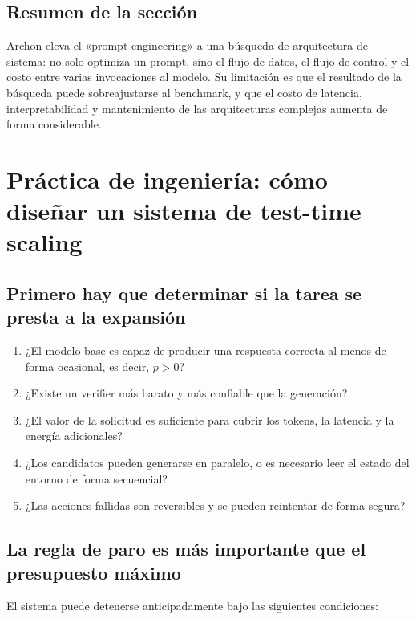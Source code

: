 \documentclass[a4paper]{article}
\begin{document}

\subsection{Resumen de la sección}

Archon eleva el «prompt engineering» a una búsqueda de arquitectura de sistema: no solo optimiza un prompt, sino el flujo de datos, el flujo de control y el costo entre varias invocaciones al modelo. Su limitación es que el resultado de la búsqueda puede sobreajustarse al benchmark, y que el costo de latencia, interpretabilidad y mantenimiento de las arquitecturas complejas aumenta de forma considerable.

\section{Práctica de ingeniería: cómo diseñar un sistema de test-time scaling}

\subsection{Primero hay que determinar si la tarea se presta a la expansión}

\begin{enumerate}
    \item ¿El modelo base es capaz de producir una respuesta correcta al menos de forma ocasional, es decir, $p>0$?
    \item ¿Existe un verifier más barato y más confiable que la generación?
    \item ¿El valor de la solicitud es suficiente para cubrir los tokens, la latencia y la energía adicionales?
    \item ¿Los candidatos pueden generarse en paralelo, o es necesario leer el estado del entorno de forma secuencial?
    \item ¿Las acciones fallidas son reversibles y se pueden reintentar de forma segura?
\end{enumerate}

\subsection{La regla de paro es más importante que el presupuesto máximo}

El sistema puede detenerse anticipadamente bajo las siguientes condiciones:
\end{document}
